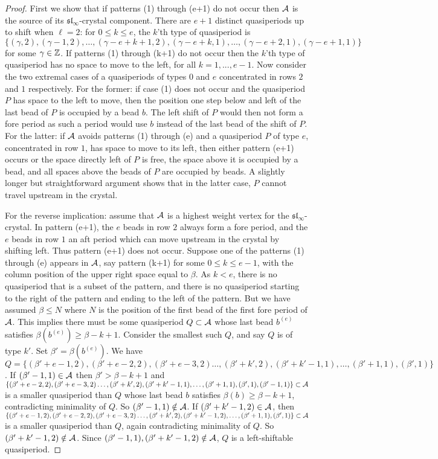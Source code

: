 \documentclass[12pt]{amsart}
\numberwithin{equation}{section}
\theoremstyle{definition}
\newcommand{\slinf}{\mathfrak{sl}_\infty}
\begin{document}
\begin{proof}
First we show that if patterns (1) through (e+1) do not occur then $\mathcal{A}$ is the source of its $\slinf$-crystal component. There are $e+1$ distinct quasiperiods up to shift when $\ell=2$: for $0\leq k \leq e$, the $k$'th type of quasiperiod is $\{(\gamma,2),(\gamma-1,2),\dots,(\gamma-e+k+1,2) ,(\gamma-e+k,1),\dots,(\gamma-e+2,1),(\gamma-e+1,1)\}$ for some $\gamma\in\mathbb{Z}$. If patterns (1) through (k+1) do not occur then the $k$'th type of quasiperiod has no space to move to the left, for all $k=1,...,e-1$. Now consider the two extremal cases of a quasiperiods of types $0$ and $e$ concentrated in rows $2$ and $1$ respectively. For the former: if case (1) does not occur and the quasiperiod $P$  has space to the left to move, then the position one step below and left of the last bead of $P$ is occupied by a bead $b$. The left shift of $P$ would then not form a fore period as such a period would use $b$ instead of the last bead of the shift of $P$. For the latter: if $\mathcal{A}$ avoids patterns (1) through (e) and a quasiperiod $P$ of type $e$, concentrated in row $1$, has space to move to its left, then either pattern (e+1) occurs or the space directly left of $P$ is free, the space above it is occupied by a bead, and all spaces above the beads of $P$ are occupied by beads. A slightly longer but straightforward argument shows that in the latter case, $P$ cannot travel upstream in the crystal. 

For the reverse implication: assume that $\mathcal{A}$ is a highest weight vertex for the $\slinf$-crystal. In pattern (e+1), the $e$ beads in row $2$ always form a fore period, and the $e$ beads in row $1$ an aft period which can move upstream in the crystal by shifting left. Thus pattern (e+1) does not occur. Suppose one of the patterns (1) through (e) appears in $\mathcal{A}$, say pattern (k+1) for some $0\leq k\leq e-1$, with the column position of the upper right space equal to $\beta$. 
As $k<e$, there is no quasiperiod that is a subset of the pattern, and there is no quasiperiod starting to the right of the pattern and ending to the left of the pattern. But we have assumed $\beta\leq N$ where $N$ is the position of the first bead of the first fore period of $\mathcal{A}$. This implies there must be some quasiperiod $Q\subset\mathcal{A}$ whose last bead $b^{(e)}$ satisfies $\beta(b^{(e)})\geq \beta-k+1$.
Consider the smallest such $Q$, and say $Q$ is of type $k'$. Set $\beta'=\beta(b^{(e)})$. We have $Q=\{(\beta'+e-1,2),(\beta'+e-2,2),(\beta'+e-3,2)\dots,(\beta'+k',2) ,(\beta'+k'-1,1),\dots,(\beta'+1,1),(\beta',1)\}$. If $(\beta'-1,1)\in\mathcal{A}$ then $\beta'>\beta-k+1$ and $\{(\beta'+e-2,2),(\beta'+e-3,2)\dots,(\beta'+k',2) ,(\beta'+k'-1,1),\dots,(\beta'+1,1),(\beta',1),(\beta'-1,1)\}\subset\mathcal{A}$ is a smaller quasiperiod than $Q$ whose last bead $b$ satisfies $\beta(b)\geq \beta-k+1$, contradicting minimality of $Q$. So $(\beta'-1,1)\notin\mathcal{A}$. If $(\beta'+k'-1,2)\in\mathcal{A}$, then $\{(\beta'+e-1,2),(\beta'+e-2,2),(\beta'+e-3,2)\dots,(\beta'+k',2) ,(\beta'+k'-1,2),\dots,(\beta'+1,1),(\beta',1)\}\subset\mathcal{A}$ is a smaller quasiperiod than $Q$, again contradicting minimality of $Q$. So $(\beta'+k'-1,2)\notin\mathcal{A}$. Since $(\beta'-1,1),(\beta'+k'-1,2)\notin\mathcal{A}$, $Q$ is a left-shiftable quasiperiod. 


\end{proof}
\end{document}
